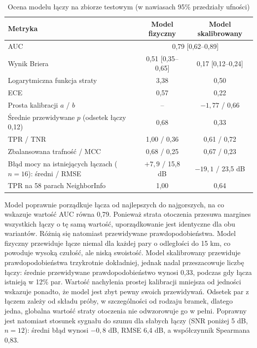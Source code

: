 \begin{table}[ht]
\centering
\caption{Ocena modelu łączy na zbiorze testowym (w nawiasach 95\% przedziały ufności)}
\label{tab:t1}
\small
\begin{tabular}{|>{\raggedright\arraybackslash}p{6.4cm}|c|c|}
\hline
\textbf{Metryka} & \textbf{Model fizyczny} & \textbf{Model skalibrowany} \\
\hline
AUC & \multicolumn{2}{c|}{0,79 [0,62--0,89]} \\
Wynik Briera & 0,51 [0,35--0,65] & 0,17 [0,12--0,24] \\
Logarytmiczna funkcja straty & 3,38 & 0,50 \\
ECE & 0,57 & 0,22 \\
Prosta kalibracji \(a\) / \(b\) & -- & \(-1{,}77\) / 0,66 \\
Średnie przewidywane \(p\) (odsetek łączy 0,12) & 0,68 & 0,33 \\
TPR / TNR & 1,00 / 0,36 & 0,61 / 0,72 \\
Zbalansowana trafność / MCC & 0,68 / 0,25 & 0,67 / 0,23 \\
Błąd mocy na istniejących łączach (\(n = 16\)): średni / RMSE & \(+7{,}9\) / 15,8 dB & \(-19{,}1\) / 23,5 dB \\
TPR na 58 parach NeighborInfo & 1,00 & 0,64 \\
\hline
\end{tabular}
\end{table}

Model poprawnie porządkuje łącza od najlepszych do najgorszych, na co wskazuje wartość AUC równa 0,79. Ponieważ strata otoczenia przesuwa margines wszystkich łączy o tę samą wartość, uporządkowanie jest identyczne dla obu wariantów. Różnią się natomiast przewidywane prawdopodobieństwa. Model fizyczny przewiduje łącze niemal dla każdej pary o odległości do 15 km, co powoduje wysoką czułość, ale niską swoistość. Model skalibrowany przewiduje prawdopodobieństwa trzykrotnie dokładniej, jednak nadal przeszacowuje liczbę łączy: średnie przewidywane prawdopodobieństwo wynosi 0,33, podczas gdy łącza istnieją w 12\% par. Wartość nachylenia prostej kalibracji mniejsza od jedności wskazuje ponadto, że model jest zbyt pewny swoich przewidywań. Odsetek par z łączem zależy od składu próby, w szczególności od rodzaju bramek, dlatego jedna, globalna wartość straty otoczenia nie odwzorowuje go w pełni. Poprawny jest natomiast stosunek sygnału do szumu dla słabych łączy (SNR poniżej 5 dB, \(n = 12\)): średni błąd wynosi \(-0{,}8\) dB, RMSE 6,4 dB, a współczynnik Spearmana 0,83.

